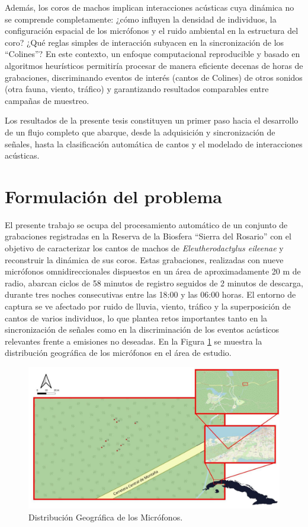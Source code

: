Además, los coros de machos implican interacciones acústicas 
cuya dinámica no se comprende completamente: ¿cómo influyen la 
densidad de individuos, la configuración espacial de los 
micrófonos y el ruido ambiental en la estructura del coro? 
¿Qué reglas simples de interacción subyacen en la sincronización 
de los “Colines”? En este contexto, un enfoque computacional reproducible
y basado en algoritmos heurísticos permitiría procesar de 
manera eficiente decenas de horas de grabaciones, discriminando 
eventos de interés (cantos de Colines) de otros sonidos 
(otra fauna, viento, tráfico) y garantizando resultados 
comparables entre campañas de muestreo.

Los resultados de la presente tesis constituyen un primer paso hacia 
el desarrollo de un 
flujo completo que abarque, desde la adquisición y sincronización 
de señales, hasta la clasificación automática de cantos y el 
modelado de interacciones acústicas.

\section{Formulación del problema}
\label{sec:formulacion_problema}

El presente trabajo se ocupa del procesamiento automático de un 
conjunto de grabaciones registradas en la Reserva de 
la Biosfera “Sierra del Rosario” con el objetivo de 
caracterizar los cantos de machos de 
\emph{Eleutherodactylus eileenae} y reconstruir la dinámica de 
sus coros. Estas grabaciones, realizadas con nueve micrófonos 
omnidireccionales dispuestos en un área de aproximadamente 20 m 
de radio, abarcan ciclos de 58 minutos de registro seguidos de 
2 minutos de descarga, durante tres noches consecutivas entre 
las 18:00 y las 06:00 horas. El entorno de captura se ve 
afectado por ruido de lluvia, viento, tráfico y la superposición 
de cantos de varios individuos, lo que plantea retos importantes 
tanto en la sincronización de señales como en la discriminación 
de los eventos acústicos relevantes frente a emisiones no 
deseadas. En la Figura \ref{fig:map} se muestra la distribución geográfica de los micrófonos en el área de estudio.

\begin{figure}[ht]
    \centering
    \includegraphics[width=\columnwidth]{Graphics/mic_map.jpg}
    \caption{Distribución Geográfica de los Micrófonos.}
    \label{fig:map}
\end{figure}

